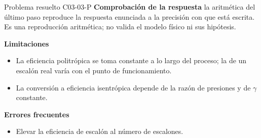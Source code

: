 \documentclass[10pt,openany]{book}
\begin{document}
\begin{studiumworked}{Problema resuelto C03-03-P}
\noindent\textbf{Comprobación de la respuesta} la aritmética del último paso reproduce la respuesta enunciada a la precisión con que está escrita. Es una reproducción aritmética; no valida el modelo físico ni sus hipótesis.

\noindent\textbf{Limitaciones}
\begin{itemize}
\item La eficiencia politrópica se toma constante a lo largo del proceso; la de un escalón real varía con el punto de funcionamiento.
\item La conversión a eficiencia isentrópica depende de la razón de presiones y de $\gamma$ constante.
\end{itemize}

\noindent\textbf{Errores frecuentes}
\begin{itemize}
\item Elevar la eficiencia de escalón al número de escalones.
\end{itemize}
\end{studiumworked}
\end{document}
